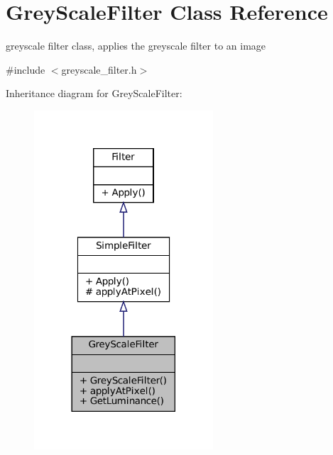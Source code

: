 \hypertarget{classGreyScaleFilter}{}\section{Grey\+Scale\+Filter Class Reference}
\label{classGreyScaleFilter}


greyscale filter class, applies the greyscale filter to an image  




{\ttfamily \#include $<$greyscale\+\_\+filter.\+h$>$}



Inheritance diagram for Grey\+Scale\+Filter\+:
\nopagebreak
\begin{figure}[H]
\begin{center}
\leavevmode
\includegraphics[width=189pt]{classGreyScaleFilter__inherit__graph}
\end{center}
\end{figure}


